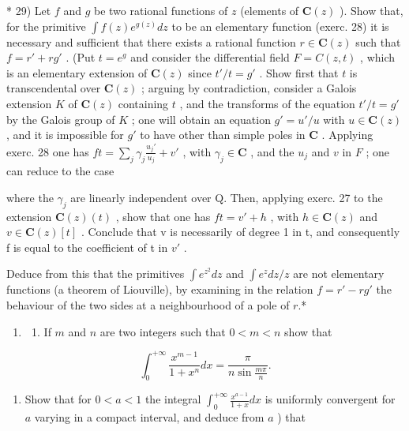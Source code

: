 * 29) Let \(f\) and \(g\) be two rational functions of \(z\) (elements of \(\mathbf{C}(z)\) ). Show that, for the primitive \(\int f(z)e^{g(z)}dz\) to be an elementary function (exerc. 28) it is necessary and sufficient that there exists a rational function \(r\in \mathbf{C}(z)\) such that \(f = r' + rg'\) . (Put \(t = e^g\) and consider the differential field \(F = C(z,t)\) , which is an elementary extension of \(\mathbf{C}(z)\) since \(t' / t = g'\) . Show first that \(t\) is transcendental over \(\mathbf{C}(z)\) ; arguing by contradiction, consider a Galois extension \(K\) of \(\mathbf{C}(z)\) containing \(t\) , and the transforms of the equation \(t' / t = g'\) by the Galois group of \(K\) ; one will obtain an equation \(g' = u' / u\) with \(u\in \mathbf{C}(z)\) , and it is impossible for \(g'\) to have other than simple poles in \(\mathbf{C}\) . Applying exerc. 28 one has \(ft = \sum_{j}\gamma_{j}\frac{u_{j}'}{u_{j}} +v'\) , with \(\gamma_{j}\in \mathbf{C}\) , and the \(u_{j}\) and \(v\) in \(F\) ; one can reduce to the case

where the \(\gamma_{j}\) are linearly independent over Q. Then, applying exerc. 27 to the extension \(\mathbf{C}(z)(t)\) , show that one has \(ft = v' + h\) , with \(h \in \mathbf{C}(z)\) and \(v \in \mathbf{C}(z)[t]\) . Conclude that v is necessarily of degree 1 in t, and consequently f is equal to the coefficient of t in \(v'\) .

Deduce from this that the primitives \(\int e^{z^2}dz\) and \(\int e^z dz / z\) are not elementary functions (a theorem of Liouville), by examining in the relation \(f = r' - rg'\) the behaviour of the two sides at a neighbourhood of a pole of \(r\).*

\begin{enumerate}
\def\labelenumi{\arabic{enumi})}
\setcounter{enumi}{29}
\tightlist
\item
  \begin{enumerate}
  \def\labelenumii{\alph{enumii})}
  \tightlist
  \item
    If \(m\) and \(n\) are two integers such that \(0 < m < n\) show that
  \end{enumerate}
\end{enumerate}

\[
\int_ {0} ^ {+ \infty} \frac {x ^ {m - 1}}{1 + x ^ {n}} d x = \frac {\pi}{n \sin \frac {m \pi}{n}}.
\]

\begin{enumerate}
\def\labelenumi{\alph{enumi})}
\setcounter{enumi}{1}
\tightlist
\item
  Show that for \(0 < a < 1\) the integral \(\int_0^{+\infty} \frac{x^{a-1}}{1 + x} dx\) is uniformly convergent for \(a\) varying in a compact interval, and deduce from \(a\) ) that
\end{enumerate}


